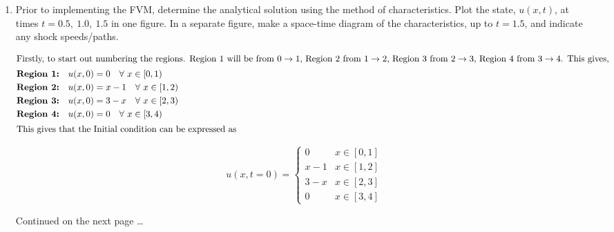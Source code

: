 \begin{enumerate}[label=\alph*., start = 1]
    \item Prior to implementing the FVM, determine the analytical solution using the method of characteristics. Plot the state, $u(x,t)$, at times $t= 0.5,\ 1.0,\ 1.5$ in one figure. In a separate figure, make a space-time diagram of the characteristics, up to $t= 1.5$, and indicate any shock speeds/paths.

    \vspace{-0.25in}
    \begin{align*}
        \shortintertext{Firstly, to start out numbering the regions. Region 1 will be from $0\rightarrow 1$, Region 2 from $1\rightarrow 2$, Region 3 from $2\rightarrow 3$, Region 4 from $3\rightarrow 4$. This gives,}
        \textbf{Region 1:}\quad & u(x,0) = 0\quad \forall\ x \in [0, 1)\\
        \textbf{Region 2:}\quad & u(x,0) = x-1\quad \forall\ x \in [1, 2)\\
        \textbf{Region 3:}\quad & u(x,0) = 3-x\quad \forall\ x \in [2, 3)\\
        \textbf{Region 4:}\quad & u(x,0) = 0\quad \forall\ x \in [3, 4)\\
        \shortintertext{This gives that the Initial condition can be expressed as}
    \end{align*}

    \vspace{-0.45in}
    \begin{equation*}
        u(x,t=0) = \begin{cases}
            0 & x \in [0,1]\\
            x - 1 & x \in [1,2]\\ 
            3-x & x \in [2,3]\\ 
            0 & x \in [3, 4]
        \end{cases}
    \end{equation*}

    \vfill 
    Continued on the next page \ldots 

\end{enumerate}


